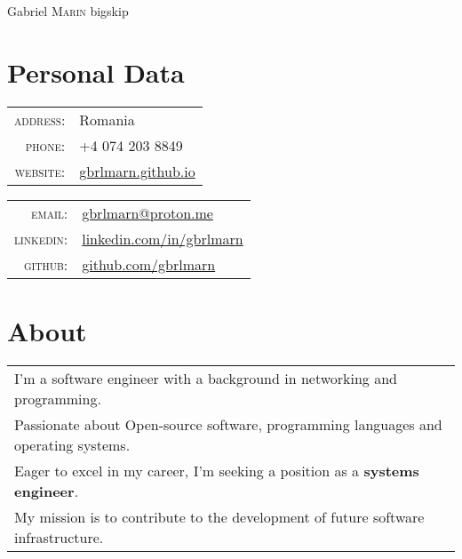 \documentclass[a4paper,12pt]{article}
\begin{document}
\pagestyle{empty}

\par
  {\centering
    {\Huge Gabriel \textsc{Marin}}
    bigskip\par
  }

\section{Personal Data}
\begin{multicols}{2}
  \begin{tabular}{rl}
    \textsc{address:}&Romania\\
    \textsc{phone:}&+4 074 203 8849\\
    \textsc{website:}&\href{https://gbrlmarn.github.io}
      {gbrlmarn.github.io}\\
  \end{tabular}
    \columnbreak
  \begin{tabular}{rl}
    \textsc{email:}&\href{mailto:gbrlmarn@proton.me}
      {gbrlmarn@proton.me}\\
    \textsc{linkedin:}&\href{https://linkedin.com/in/gbrlmarn}
      {linkedin.com/in/gbrlmarn}\\
    \textsc{github:}&\href{https://github.com/gbrlmarn}
      {github.com/gbrlmarn}\\
  \end{tabular}
\end{multicols}

\section{About}
\begin{tabular}{l}
I'm a software engineer with a background in 
networking and programming.\\
Passionate about Open-source software, 
programming languages and operating systems.\\
Eager to excel in my career, 
I'm seeking a position as a \textbf{systems engineer}.\\ 
My mission is to contribute to the development 
of future software infrastructure.\\
\end{tabular}

\end{document}
